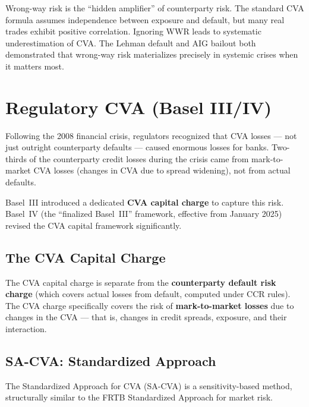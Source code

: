 \documentclass[11pt, a4paper]{article}
\theoremstyle{definition}
\theoremstyle{plain}
\theoremstyle{remark}
\begin{document}
\begin{keyresult}
Wrong-way risk is the ``hidden amplifier'' of counterparty risk.
The standard CVA formula assumes independence between exposure and default,
but many real trades exhibit positive correlation.
Ignoring WWR leads to systematic underestimation of CVA\@.
The Lehman default and AIG bailout both demonstrated that wrong-way risk
materializes precisely in systemic crises when it matters most.
\end{keyresult}

\section{Regulatory CVA (Basel III/IV)}
\label{sec:regulatory-cva}

Following the 2008 financial crisis, regulators recognized that CVA losses ---
not just outright counterparty defaults --- caused enormous losses for banks.
Two-thirds of the counterparty credit losses during the crisis came from
mark-to-market CVA losses (changes in CVA due to spread widening),
not from actual defaults.

Basel~III introduced a dedicated \textbf{CVA capital charge} to capture this risk.
Basel~IV (the ``finalized Basel~III'' framework, effective from January 2025)
revised the CVA capital framework significantly.

\subsection{The CVA Capital Charge}

The CVA capital charge is separate from the \textbf{counterparty default risk charge}
(which covers actual losses from default, computed under CCR rules).
The CVA charge specifically covers the risk of \textbf{mark-to-market losses}
due to changes in the CVA --- that is, changes in credit spreads, exposure,
and their interaction.

\subsection{SA-CVA: Standardized Approach}

The Standardized Approach for CVA (SA-CVA) is a sensitivity-based method,
structurally similar to the FRTB Standardized Approach for market risk.
\end{document}
